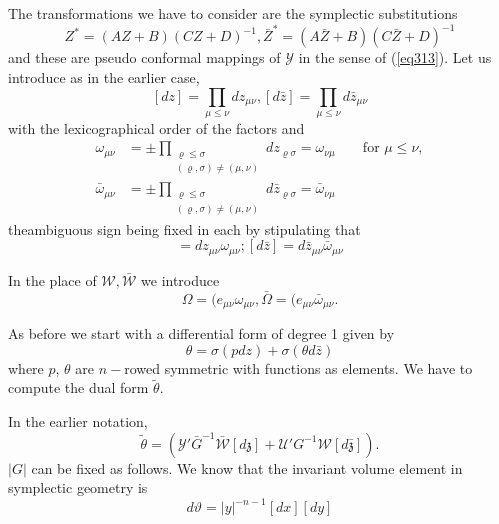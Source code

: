  The transformations we have to consider are the symplectic
 substitutions  
 $$
 Z^* = (AZ + B ) (CZ + D ) ^{-1}, \bar{Z}^* = (A \bar{Z} + B )
 (C\bar{Z} + D ) ^{-1} 
 $$
 and these are pseudo conformal mappings of $\mathscr{Y}$ in the sense
 of (\ref{eq313}). Let us introduce as in the earlier case,  
 $$
 [dz] = \prod_{\mu \leq \nu} dz _{\mu \nu }, [d \bar z] = \prod_{\mu
   \leq \nu} d \bar {z} _{\mu \nu } 
 $$
 with the lexicographical order of the factors and  
 \begin{align*}
\omega_{\mu \nu } & = \pm \prod_{\substack{\varrho \leq \sigma
    \\ (\varrho, \sigma ) \neq (\mu, \nu )}} dz_{\varrho \sigma } =
\omega_{\nu \mu } 
 & &  \text { for } \mu \leq \nu, \\ 
\bar { \omega}_{\mu \nu } & = \pm \prod_{\substack{\varrho \leq \sigma
    \\ (\varrho, \sigma ) \neq (\mu, \nu )}} d\bar{z}_{\varrho \sigma
} = \bar{\omega}_{\nu \mu } 
 \end{align*} 
 the\pageoriginale ambiguous sign being fixed in each by stipulating
 that   
 \begin{equation*}
[dz] = dz_{\mu \nu } \omega_{ \mu \nu }; [d\bar {z}] = d\bar{z}_{\mu
  \nu } \bar{\omega}_{ \mu \nu } \tag{326}\label{eq326}  
 \end{equation*} 
 
 In the place of $\mathscr{W}, \bar{\mathscr{W}} $ we introduce  
 \begin{equation*}
\Omega = (e_{\mu \nu } \omega_{ \mu \nu }, \bar{\Omega} = (e_{\mu \nu
} \bar{\omega}_{ \mu \nu }. \tag{327}\label{eq327}  
 \end{equation*} 
 
 As before we start with a differential form of degree 1 given by  
 \begin{equation*}
\theta = \sigma (p d z ) + \sigma (\theta d \bar{z}) \tag{328}\label{eq328} 
 \end{equation*} 
 where $p$, $\theta $ are $n-$rowed symmetric with functions as
 elements. We have to compute the dual form $\tilde{\theta}$.  
 
 In the earlier notation, 
 \begin{equation*}
\tilde{\theta} = (\mathcal{Y}' \bar{G}^{-1} \bar{\mathscr{W}} [ d
  \mathfrak{z}] + \mathscr{U}' G^{-1} \mathscr{W} [ d
  \bar{\mathfrak{z}}]). \tag{$(318)'$}\label{eq318'} 
 \end{equation*} 
 $|G|$ can be fixed as follows. We know that the invariant volume
 element in symplectic geometry is  
 $$
 d \vartheta = |y|^{-n-1} [dx ] [dy]
 $$
 
